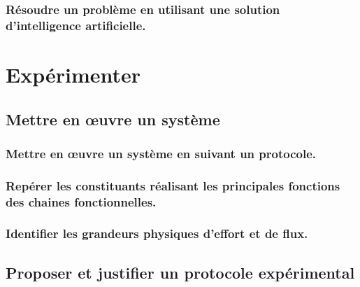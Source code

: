 \documentclass[10pt,fleqn]{book}
\begin{document}
\subsection{Résoudre un problème en utilisant une solution d'intelligence artificielle. } 

\begin{multicols}{2} 

\end{multicols}

\chapter{Expérimenter} 

\section{Mettre en œuvre un système} 

\subsection{Mettre en œuvre un système en suivant un protocole.} 

\begin{multicols}{2} 

\end{multicols}

\subsection{Repérer les constituants réalisant les principales fonctions des chaines fonctionnelles.} 

\begin{multicols}{2} 

\end{multicols}

\subsection{Identifier les grandeurs physiques d’effort et de flux.} 

\begin{multicols}{2} 

\end{multicols}

\section{Proposer et justifier un protocole expérimental} 
\end{document}
